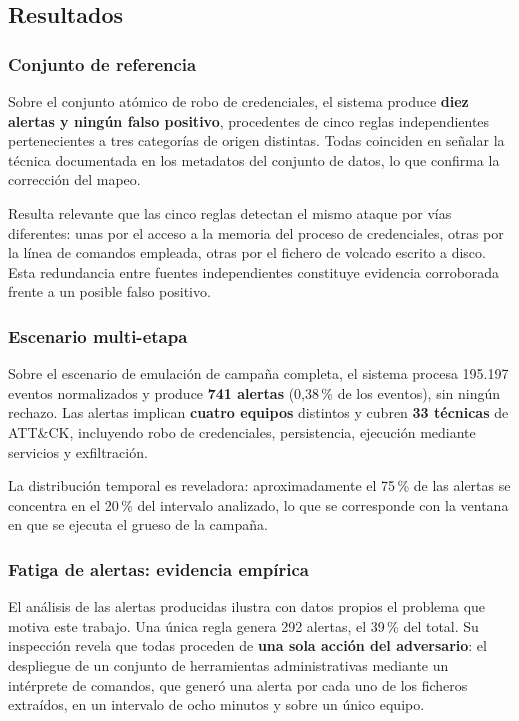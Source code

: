 \subsection{Resultados}

\subsubsection{Conjunto de referencia}

Sobre el conjunto atómico de robo de credenciales, el sistema produce \textbf{diez alertas y
ningún falso positivo}, procedentes de cinco reglas independientes pertenecientes a tres
categorías de origen distintas. Todas coinciden en señalar la técnica documentada en los
metadatos del conjunto de datos, lo que confirma la corrección del mapeo.

Resulta relevante que las cinco reglas detectan el mismo ataque por vías diferentes: unas por
el acceso a la memoria del proceso de credenciales, otras por la línea de comandos empleada,
otras por el fichero de volcado escrito a disco. Esta redundancia entre fuentes independientes
constituye evidencia corroborada frente a un posible falso positivo.

\subsubsection{Escenario multi-etapa}

Sobre el escenario de emulación de campaña completa, el sistema procesa 195.197 eventos
normalizados y produce \textbf{741 alertas} (0,38\,\% de los eventos), sin ningún rechazo. Las
alertas implican \textbf{cuatro equipos} distintos y cubren \textbf{33 técnicas} de ATT\&CK,
incluyendo robo de credenciales, persistencia, ejecución mediante servicios y exfiltración.

La distribución temporal es reveladora: aproximadamente el 75\,\% de las alertas se concentra
en el 20\,\% del intervalo analizado, lo que se corresponde con la ventana en que se ejecuta
el grueso de la campaña.

\subsubsection{Fatiga de alertas: evidencia empírica}

El análisis de las alertas producidas ilustra con datos propios el problema que motiva este
trabajo. Una única regla genera 292 alertas, el 39\,\% del total. Su inspección revela que
todas proceden de \textbf{una sola acción del adversario}: el despliegue de un conjunto de
herramientas administrativas mediante un intérprete de comandos, que generó una alerta por
cada uno de los ficheros extraídos, en un intervalo de ocho minutos y sobre un único equipo.

